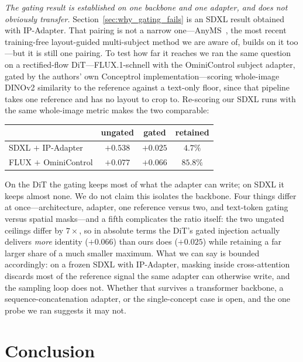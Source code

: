 \documentclass[10pt,twocolumn,letterpaper]{article}
\begin{document}
\noindent\textit{The gating result is established on one backbone and one
adapter, and does not obviously transfer.}
Section~\ref{sec:why_gating_fails} is an SDXL result obtained with
IP-Adapter.  That pairing is not a narrow one---AnyMS~\cite{yu2025anyms},
the most recent training-free layout-guided multi-subject method we are aware
of, builds on it too---but it is still one pairing.  To test how far it reaches we ran the same question on a
rectified-flow DiT---FLUX.1-schnell with the OminiControl subject adapter,
gated by the authors' own Conceptrol implementation---scoring whole-image
DINOv2 similarity to the reference against a text-only floor, since that
pipeline takes one reference and has no layout to crop to.  Re-scoring our
SDXL runs with the same whole-image metric makes the two comparable:

\begin{center}\small
\begin{tabular}{lccc}
\toprule
 & ungated & gated & retained \\
\midrule
SDXL $+$ IP-Adapter      & $+0.538$ & $+0.025$ & $4.7\%$ \\
FLUX $+$ OminiControl    & $+0.077$ & $+0.066$ & $85.8\%$ \\
\bottomrule
\end{tabular}
\end{center}

\noindent
On the DiT the gating keeps most of what the adapter can write; on SDXL it
keeps almost none.  We do not claim this isolates the backbone.  Four things
differ at once---architecture, adapter, one reference versus two, and
text-token gating versus spatial masks---and a fifth complicates the ratio
itself: the two ungated ceilings differ by $7\times$, so in absolute terms
the DiT's gated injection actually delivers \emph{more} identity ($+0.066$)
than ours does ($+0.025$) while retaining a far larger share of a much
smaller maximum.  What we can say is bounded accordingly: on a frozen SDXL
with IP-Adapter, masking inside cross-attention discards most of the
reference signal the same adapter can otherwise write, and the sampling
loop does not.  Whether that survives a transformer backbone, a
sequence-concatenation adapter, or the single-concept case is open, and the
one probe we ran suggests it may not.

\section{Conclusion}
\label{sec:conclusion}
\end{document}
